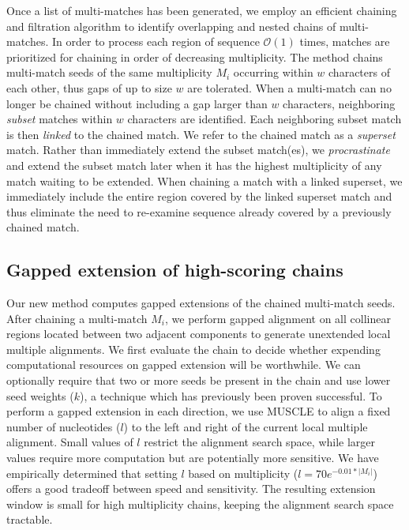\documentclass{llncs}
\begin{document}
Once a list of multi-matches has been generated, we employ an
efficient chaining and filtration algorithm to identify overlapping
and nested chains of multi-matches\cite{ref-procrast}. In order to
process each region of sequence $\mathcal{O}(1)$ times, matches
are prioritized for chaining in order of decreasing multiplicity.  The
method chains multi-match seeds of the same multiplicity $M_{i}$
occurring within $w$ characters of each other, thus gaps of up to size
$w$ are tolerated.  When a multi-match can
no longer be chained without including a gap larger than $w$
characters, neighboring \textit{subset} matches within $w$ characters
are identified. Each neighboring subset match is then \textit{linked}
to the chained match. We refer to the chained match as a
\textit{superset} match. Rather than immediately extend the subset
match(es), we \textit{procrastinate} and extend the subset match later
when it has the highest multiplicity of any match waiting to be
extended. When chaining a match with a linked superset, we immediately
include the entire region covered by the linked superset match and
thus eliminate the need to re-examine sequence already covered by a
previously chained match.

\subsection{Gapped extension of high-scoring chains}
Our new method computes gapped extensions of the chained multi-match seeds.
After chaining a multi-match $M_i$, we perform gapped alignment on all
collinear regions located between two adjacent components to generate
unextended local multiple alignments. We first evaluate the chain to
decide whether expending computational resources on gapped extension
will be worthwhile. We can optionally require that two or more seeds be present
in the chain and use lower seed weights ($k$), a technique which has
previously been proven
successful\cite{ref-blastz,ref-gappedblast,ref-blat}.  To perform a
gapped extension in each direction, we use MUSCLE to align a fixed
number of nucleotides ($l$) to the left and right of the current local
multiple alignment.  Small values of $l$ restrict the alignment search
space, while larger values require more computation but are
potentially more sensitive.  We have empirically determined that
setting $l$ based on multiplicity ($l = 70e^{-0.01*|M_{i}|}$) offers a
good tradeoff between speed and sensitivity.  The resulting extension
window is small for high multiplicity chains,
keeping the alignment search space tractable.
\end{document}
